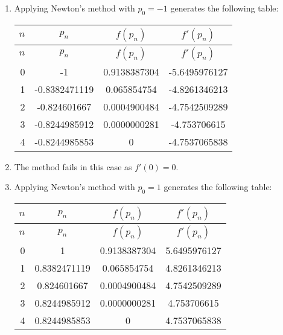 \documentclass[../../../../Assignments]{subfiles}
\begin{document}
\begin{solution}
\begin{enumerate}[label = \alph*)]
        \item Applying Newton's method with \(p_0 = -1\) generates the following
            table:

            \begin{longtable}{r S[table-format=-1.10] S[table-format=1.10] S[table-format=-1.10]}
                \toprule
                \(n\)  &    {\(p_n\)}    &  {\(f(p_n)\)}  &  {\(f'(p_n)\)}  \\
                \midrule
                \endfirsthead
                \(n\)  &    {\(p_n\)}    &  {\(f(p_n)\)}  &  {\(f'(p_n)\)}  \\
                \midrule
                  &  -1             &  0.9138387304  &  -5.6495976127  \\
                    1  &  -0.8382471119  &  0.065854754   &  -4.8261346213  \\
                    2  &  -0.824601667   &  0.0004900484  &  -4.7542509289  \\
                    3  &  -0.8244985912  &  0.0000000281  &  -4.753706615   \\
                    4  &  -0.8244985853  &  0             &  -4.7537065838  \\
                \bottomrule
            \end{longtable}

        \item The method fails in this case as \(f'(0) = 0\).

        \item Applying Newton's method with \(p_0 = 1\) generates the following
            table:

            \begin{longtable}{r S[table-format=1.10] S[table-format=1.10] S[table-format=1.10]}
                \toprule
                \(n\)  &    {\(p_n\)}   &   {\(f(p_n)\)}  &  {\(f'(p_n)\)}  \\
                \midrule
                \endfirsthead
                \(n\)  &    {\(p_n\)}   &   {\(f(p_n)\)}  &  {\(f'(p_n)\)}  \\
                \midrule
                  &  1             &   0.9138387304  &  5.6495976127   \\
                    1  &  0.8382471119  &   0.065854754   &  4.8261346213   \\
                    2  &  0.824601667   &   0.0004900484  &  4.7542509289   \\
                    3  &  0.8244985912  &   0.0000000281  &  4.753706615    \\
                    4  &  0.8244985853  &   0             &  4.7537065838   \\
                \bottomrule
            \end{longtable}


\end{enumerate}
\end{solution}
\end{document}

